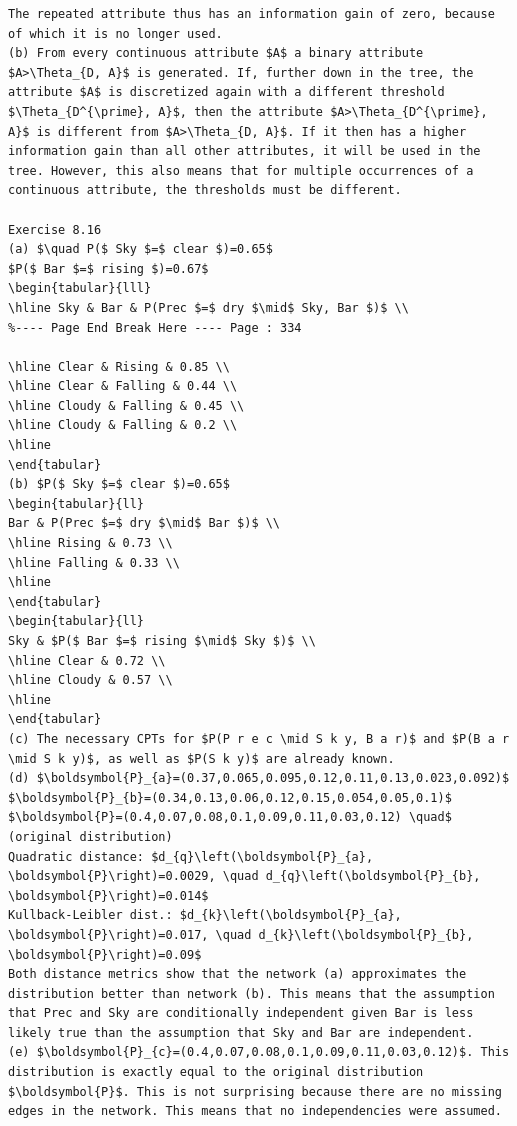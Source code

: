 \documentclass[10pt]{book}
\begin{document}
\begin{verbatim}
The repeated attribute thus has an information gain of zero, because of which it is no longer used.
(b) From every continuous attribute $A$ a binary attribute $A>\Theta_{D, A}$ is generated. If, further down in the tree, the attribute $A$ is discretized again with a different threshold $\Theta_{D^{\prime}, A}$, then the attribute $A>\Theta_{D^{\prime}, A}$ is different from $A>\Theta_{D, A}$. If it then has a higher information gain than all other attributes, it will be used in the tree. However, this also means that for multiple occurrences of a continuous attribute, the thresholds must be different.

Exercise 8.16
(a) $\quad P($ Sky $=$ clear $)=0.65$
$P($ Bar $=$ rising $)=0.67$
\begin{tabular}{lll}
\hline Sky & Bar & P(Prec $=$ dry $\mid$ Sky, Bar $)$ \\
%---- Page End Break Here ---- Page : 334

\hline Clear & Rising & 0.85 \\
\hline Clear & Falling & 0.44 \\
\hline Cloudy & Falling & 0.45 \\
\hline Cloudy & Falling & 0.2 \\
\hline
\end{tabular}
(b) $P($ Sky $=$ clear $)=0.65$
\begin{tabular}{ll} 
Bar & P(Prec $=$ dry $\mid$ Bar $)$ \\
\hline Rising & 0.73 \\
\hline Falling & 0.33 \\
\hline
\end{tabular}
\begin{tabular}{ll} 
Sky & $P($ Bar $=$ rising $\mid$ Sky $)$ \\
\hline Clear & 0.72 \\
\hline Cloudy & 0.57 \\
\hline
\end{tabular}
(c) The necessary CPTs for $P(P r e c \mid S k y, B a r)$ and $P(B a r \mid S k y)$, as well as $P(S k y)$ are already known.
(d) $\boldsymbol{P}_{a}=(0.37,0.065,0.095,0.12,0.11,0.13,0.023,0.092)$
$\boldsymbol{P}_{b}=(0.34,0.13,0.06,0.12,0.15,0.054,0.05,0.1)$
$\boldsymbol{P}=(0.4,0.07,0.08,0.1,0.09,0.11,0.03,0.12) \quad$ (original distribution)
Quadratic distance: $d_{q}\left(\boldsymbol{P}_{a}, \boldsymbol{P}\right)=0.0029, \quad d_{q}\left(\boldsymbol{P}_{b}, \boldsymbol{P}\right)=0.014$
Kullback-Leibler dist.: $d_{k}\left(\boldsymbol{P}_{a}, \boldsymbol{P}\right)=0.017, \quad d_{k}\left(\boldsymbol{P}_{b}, \boldsymbol{P}\right)=0.09$
Both distance metrics show that the network (a) approximates the distribution better than network (b). This means that the assumption that Prec and Sky are conditionally independent given Bar is less likely true than the assumption that Sky and Bar are independent.
(e) $\boldsymbol{P}_{c}=(0.4,0.07,0.08,0.1,0.09,0.11,0.03,0.12)$. This distribution is exactly equal to the original distribution $\boldsymbol{P}$. This is not surprising because there are no missing edges in the network. This means that no independencies were assumed.


\end{verbatim}
\end{document}
